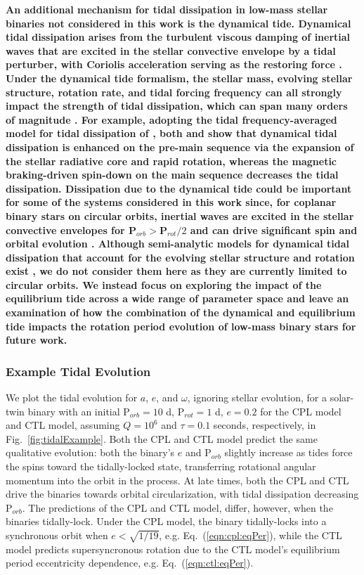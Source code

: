 \documentclass[twocolumn]{aastex61}
\newcommand{\xxx}[1]{{\textbf{#1}}}
\begin{document}
\xxx{An additional mechanism for tidal dissipation in low-mass stellar binaries not considered in this work is the dynamical tide. Dynamical tidal dissipation arises from the turbulent viscous damping of inertial waves that are excited in the stellar convective envelope by a tidal perturber, with Coriolis acceleration serving as the restoring force \citep{Zahn1975, Ogilvie2007}. Under the dynamical tide formalism, the stellar mass, evolving stellar structure, rotation rate, and tidal forcing frequency can all strongly impact the strength of tidal dissipation, which can span many orders of magnitude \citep{Ogilvie2007,Ogilvie2013,Mathis2015,Gallet2017}. For example, adopting the tidal frequency-averaged model for tidal dissipation of \citet{Ogilvie2013}, both \citet{Mathis2015} and \citet{Gallet2017} show that dynamical tidal dissipation is enhanced on the pre-main sequence via the expansion of the stellar radiative core and rapid rotation, whereas the magnetic braking-driven spin-down on the main sequence decreases the tidal dissipation. Dissipation due to the dynamical tide could be important for some of the systems considered in this work since, for coplanar binary stars on circular orbits, inertial waves are excited in the stellar convective envelopes for P$_{orb} > $P$_{rot}/2$ and can drive significant spin and orbital evolution \citep[e.g.][]{Witte2002,Ogilvie2007,Bolmont2016}. Although semi-analytic models for dynamical tidal dissipation that account for the evolving stellar structure and rotation exist \citep[e.g.][]{Ogilvie2013,Mathis2015,Bolmont2016,Gallet2017}, we do not consider them here as they are currently limited to circular orbits. We instead focus on exploring the impact of the equilibrium tide across a wide range of parameter space and leave an examination of how the combination of the dynamical and equilibrium tide impacts the rotation period evolution of low-mass binary stars for future work.}

\subsubsection{Example Tidal Evolution} \label{sec:methods:eqtideExample}

We plot the tidal evolution for $a$, $e$, and $\omega$, ignoring stellar evolution, for a solar-twin binary with an initial P$_{orb} = 10$ d, P$_{rot} = 1$ d, $e = 0.2$ for the CPL model and CTL model, assuming $Q=10^6$ and $\tau = 0.1$ seconds, respectively, in Fig.~\ref{fig:tidalExample}. Both the CPL and CTL model predict the same qualitative evolution: both the binary's $e$ and P$_{orb}$ slightly increase as tides force the spins toward the tidally-locked state, transferring rotational angular momentum into the orbit in the process.  At late times, both the CPL and CTL drive the binaries towards orbital circularization, with tidal dissipation decreasing P$_{orb}$. The predictions of the CPL and CTL model, differ, however, when the binaries tidally-lock.  Under the CPL model, the binary tidally-locks into a synchronous orbit when $e < \sqrt{1/19}$, e.g. Eq.~(\ref{eqn:cpl:eqPer}), while the CTL model predicts supersyncronous rotation due to the CTL model's equilibrium period eccentricity dependence, e.g. Eq.~(\ref{eqn:ctl:eqPer}).
\end{document}
